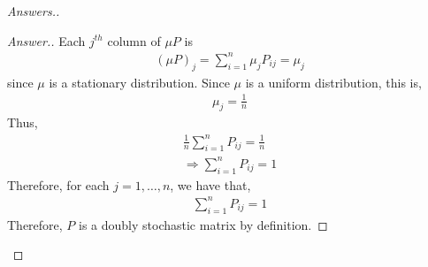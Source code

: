 \documentclass[10pt,twoside]{article}
\begin{document}
\begin{itemize}
\begin{proof}[Answers.]
\begin{enumerate}
\begin{proof}[Answer.]
            Each $j^{th}$ column of $\mu P$ is
            \begin{gather*}
                (\mu P)_j = \sum_{i=1}^n \mu_j P_{i j} = \mu_j
            \end{gather*}
            since $\mu$ is a stationary distribution. Since $\mu$ is a uniform distribution, this is,
            \begin{gather*}
                \mu_j = \frac{1}{n}
            \end{gather*}
            Thus, 
            \begin{gather*}
                \frac{1}{n}\sum_{i=1}^n P_{ij} = \frac{1}{n} \\
                \Rightarrow \sum_{i=1}^n P_{ij} = 1
            \end{gather*}
            Therefore, for each $j=1,\ldots, n$, we have that,
            \begin{gather*}
                \sum_{i=1}^n P_{ij} = 1
            \end{gather*}
           Therefore, $P$ is a doubly stochastic matrix by definition.
            
            
        \end{proof}

        
    \end{enumerate}
    \end{proof}
    

\end{itemize}
\end{document}
